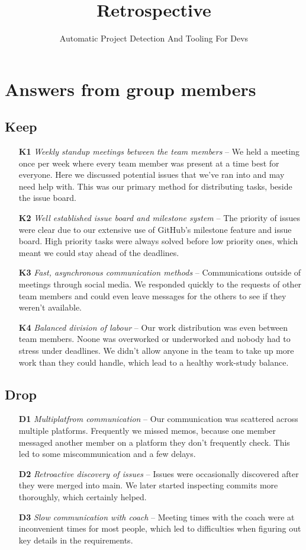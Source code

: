 \documentclass{article}
\title{Retrospective}
\author{Automatic Project Detection And Tooling For Devs}
\date{}
\begin{document}
\maketitle

\section*{Answers from group members} %

\subsection*{Keep}
\begin{itemize}
  \item[\textbf{K1}] \textit{Weekly standup meetings between the team members} -- We held a meeting once per week where every team member was present at a time best for everyone. Here we discussed potential issues that we've ran into and may need help with. This was our primary method for distributing tasks, beside the issue board.
  \item[\textbf{K2}] \textit{Well established issue board and milestone system} -- The priority of issues were clear due to our extensive use of GitHub's milestone feature and issue board. High priority tasks were always solved before low priority ones, which meant we could stay ahead of the deadlines.
  \item[\textbf{K3}] \textit{Fast, asynchronous communication methods} -- Communications outside of meetings through social media. We responded quickly to the requests of other team members and could even leave messages for the others to see if they weren't available.
  \item[\textbf{K4}] \textit{Balanced division of labour} -- Our work distribution was even between team members. Noone was overworked or underworked and nobody had to stress under deadlines. We didn't allow anyone in the team to take up more work than they could handle, which lead to a healthy work-study balance.
\end{itemize}

\subsection*{Drop}
\begin{itemize}
  \item[\textbf{D1}] \textit{Multiplatfrom communication} -- Our communication was scattered across multiple platforms. Frequently we missed memos, because one member messaged another member on a platform they don't frequently check. This led to some miscommunication and a few delays.
  \item[\textbf{D2}] \textit{Retroactive discovery of issues} -- Issues were occasionally discovered after they were merged into main. We later started inspecting commits more thoroughly, which certainly helped.
  \item[\textbf{D3}] \textit{Slow communication with coach} -- Meeting times with the coach were at inconvenient times for most people, which led to difficulties when figuring out key details in the requirements.
\end{itemize}
\end{document}

